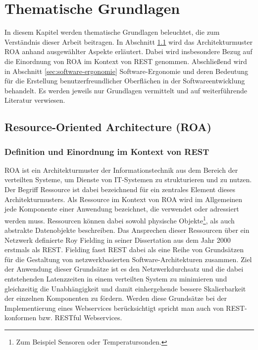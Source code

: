 \chapter{Thematische Grundlagen}
\label{cha:Thematische Grundlagen}

In diesem Kapitel werden thematische Grundlagen beleuchtet, die zum Verständnis dieser Arbeit beitragen. In Abschnitt \ref{sec:ROA} wird das Architekturmuster \ac{ROA} anhand ausgewählter Aspekte erläutert. Dabei wird insbesondere Bezug auf die Einordnung von ROA im Kontext von \ac{REST} genommen. Abschließend wird in Abschnitt \ref{sec:software-ergonomie} Software-Ergonomie und deren Bedeutung für die Erstellung benutzerfreundlicher Oberflächen in der Softwareentwicklung behandelt. Es werden jeweils nur Grundlagen vermittelt und auf weiterführende Literatur verwiesen.

\section{Resource-Oriented Architecture (ROA)}
\label{sec:ROA}

\subsection{Definition und Einordnung im Kontext von REST}
\label{sec:ROA:Definition und Einordnung im Kontext von REST}

\acf{ROA} ist ein Architekturmuster der Informationstechnik aus dem Bereich der verteilten Systeme, um Dienste von IT-Systemen zu strukturieren und zu nutzen. Der Begriff Ressource ist dabei bezeichnend für ein zentrales Element dieses Architekturmusters. Als Ressource im Kontext von \ac{ROA} wird im Allgemeinen jede Komponente einer Anwendung bezeichnet, die verwendet oder adressiert werden muss. Ressourcen können dabei sowohl physische Objekte\footnote{Zum Beispiel Sensoren oder Temperatursonden.}, als auch abstrakte Datenobjekte beschreiben. \parencite[vgl.][2]{REST2010} Das Ansprechen dieser Ressourcen über ein Netzwerk definierte Roy Fielding in seiner Dissertation aus dem Jahr 2000 erstmals als \acf{REST}. Fielding fasst REST dabei als eine Reihe von Grundsätzen für die Gestaltung von netzwerkbasierten Software-Architekturen zusammen. Ziel der Anwendung dieser Grundsätze ist es den Netzwerkdurchsatz und die dabei entstehenden Latenzzeiten in einem verteilten System zu minimieren und gleichzeitig die Unabhängigkeit und damit einhergehende bessere Skalierbarkeit der einzelnen Komponenten zu fördern. \parencite[vgl.][35,76]{Fielding2000} Werden diese Grundsätze bei der Implementierung eines Webservices berücksichtigt spricht man auch von REST-konformen bzw. RESTful Webservices.

